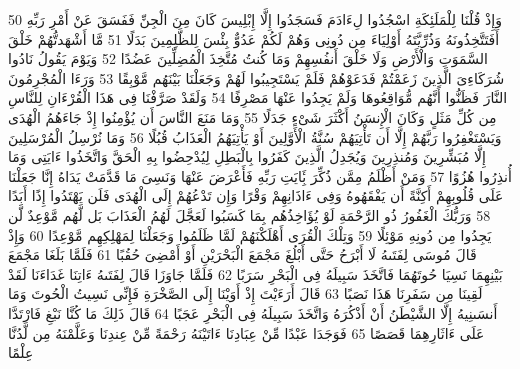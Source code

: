 \documentclass[20pt,a4paper]{article}
\begin{document}
{\tiny\colorbox{cl_aya}{50}} وَإِذْ قُلْنَا لِلْمَلَئِكَةِ اسْجُدُوا لِءَادَمَ فَسَجَدُوا إِلَّا إِبْلِيسَ كَانَ مِنَ الْجِنِّ فَفَسَقَ عَنْ أَمْرِ رَبِّهِ أَفَتَتَّخِذُونَهُ وَذُرِّيَّتَهُ أَوْلِيَاءَ مِن دُونِى وَهُمْ لَكُمْ عَدُوٌّ بِئْسَ لِلظَّلِمِينَ بَدَلًا
{\tiny\colorbox{cl_aya}{51}} مَّا أَشْهَدتُّهُمْ خَلْقَ السَّمَوَتِ وَالْأَرْضِ وَلَا خَلْقَ أَنفُسِهِمْ وَمَا كُنتُ مُتَّخِذَ الْمُضِلِّينَ عَضُدًا
{\tiny\colorbox{cl_aya}{52}} وَيَوْمَ يَقُولُ نَادُوا شُرَكَاءِىَ الَّذِينَ زَعَمْتُمْ فَدَعَوْهُمْ فَلَمْ يَسْتَجِيبُوا لَهُمْ وَجَعَلْنَا بَيْنَهُم مَّوْبِقًا
{\tiny\colorbox{cl_aya}{53}} وَرَءَا الْمُجْرِمُونَ النَّارَ فَظَنُّوا أَنَّهُم مُّوَاقِعُوهَا وَلَمْ يَجِدُوا عَنْهَا مَصْرِفًا
{\tiny\colorbox{cl_aya}{54}} وَلَقَدْ صَرَّفْنَا فِى هَذَا الْقُرْءَانِ لِلنَّاسِ مِن كُلِّ مَثَلٍ وَكَانَ الْإِنسَنُ أَكْثَرَ شَىْءٍ جَدَلًا
{\tiny\colorbox{cl_aya}{55}} وَمَا مَنَعَ النَّاسَ أَن يُؤْمِنُوا إِذْ جَاءَهُمُ الْهُدَى وَيَسْتَغْفِرُوا رَبَّهُمْ إِلَّا أَن تَأْتِيَهُمْ سُنَّةُ الْأَوَّلِينَ أَوْ يَأْتِيَهُمُ الْعَذَابُ قُبُلًا
{\tiny\colorbox{cl_aya}{56}} وَمَا نُرْسِلُ الْمُرْسَلِينَ إِلَّا مُبَشِّرِينَ وَمُنذِرِينَ وَيُجَدِلُ الَّذِينَ كَفَرُوا بِالْبَطِلِ لِيُدْحِضُوا بِهِ الْحَقَّ وَاتَّخَذُوا ءَايَتِى وَمَا أُنذِرُوا هُزُوًا
{\tiny\colorbox{cl_aya}{57}} وَمَنْ أَظْلَمُ مِمَّن ذُكِّرَ بَِٔايَتِ رَبِّهِ فَأَعْرَضَ عَنْهَا وَنَسِىَ مَا قَدَّمَتْ يَدَاهُ إِنَّا جَعَلْنَا عَلَى قُلُوبِهِمْ أَكِنَّةً أَن يَفْقَهُوهُ وَفِى ءَاذَانِهِمْ وَقْرًا وَإِن تَدْعُهُمْ إِلَى الْهُدَى فَلَن يَهْتَدُوا إِذًا أَبَدًا
{\tiny\colorbox{cl_aya}{58}} وَرَبُّكَ الْغَفُورُ ذُو الرَّحْمَةِ لَوْ يُؤَاخِذُهُم بِمَا كَسَبُوا لَعَجَّلَ لَهُمُ الْعَذَابَ بَل لَّهُم مَّوْعِدٌ لَّن يَجِدُوا مِن دُونِهِ مَوْئِلًا
{\tiny\colorbox{cl_aya}{59}} وَتِلْكَ الْقُرَى أَهْلَكْنَهُمْ لَمَّا ظَلَمُوا وَجَعَلْنَا لِمَهْلِكِهِم مَّوْعِدًا
{\tiny\colorbox{cl_aya}{60}} وَإِذْ قَالَ مُوسَى لِفَتَىهُ لَا أَبْرَحُ حَتَّى أَبْلُغَ مَجْمَعَ الْبَحْرَيْنِ أَوْ أَمْضِىَ حُقُبًا
{\tiny\colorbox{cl_aya}{61}} فَلَمَّا بَلَغَا مَجْمَعَ بَيْنِهِمَا نَسِيَا حُوتَهُمَا فَاتَّخَذَ سَبِيلَهُ فِى الْبَحْرِ سَرَبًا
{\tiny\colorbox{cl_aya}{62}} فَلَمَّا جَاوَزَا قَالَ لِفَتَىهُ ءَاتِنَا غَدَاءَنَا لَقَدْ لَقِينَا مِن سَفَرِنَا هَذَا نَصَبًا
{\tiny\colorbox{cl_aya}{63}} قَالَ أَرَءَيْتَ إِذْ أَوَيْنَا إِلَى الصَّخْرَةِ فَإِنِّى نَسِيتُ الْحُوتَ وَمَا أَنسَىنِيهُ إِلَّا الشَّيْطَنُ أَنْ أَذْكُرَهُ وَاتَّخَذَ سَبِيلَهُ فِى الْبَحْرِ عَجَبًا
{\tiny\colorbox{cl_aya}{64}} قَالَ ذَلِكَ مَا كُنَّا نَبْغِ فَارْتَدَّا عَلَى ءَاثَارِهِمَا قَصَصًا
{\tiny\colorbox{cl_aya}{65}} فَوَجَدَا عَبْدًا مِّنْ عِبَادِنَا ءَاتَيْنَهُ رَحْمَةً مِّنْ عِندِنَا وَعَلَّمْنَهُ مِن لَّدُنَّا عِلْمًا
\end{document}
